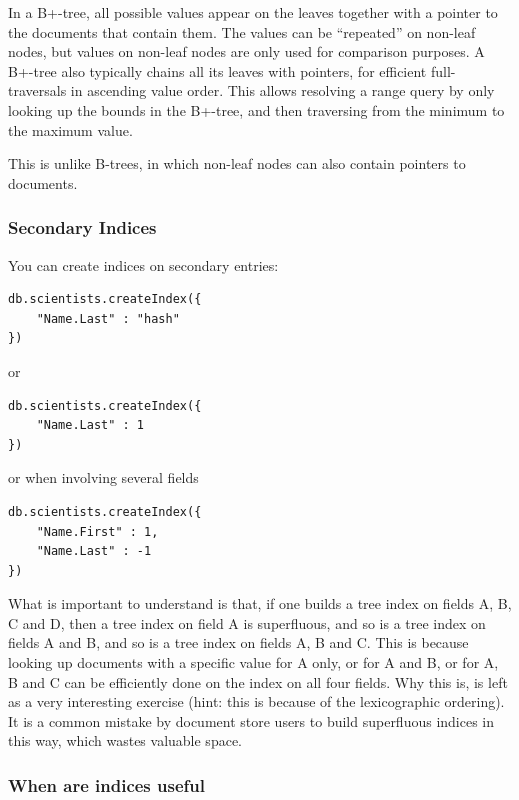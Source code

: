In a B+-tree, all possible values appear on the leaves together with a pointer to the documents that contain them. The values can be “repeated” on non-leaf nodes, but values on non-leaf nodes are only used for comparison purposes. A B+-tree also typically chains all its leaves with pointers, for efficient full-traversals in ascending value order. This allows resolving a range query by only looking up the bounds in the B+-tree, and then traversing from the minimum to the maximum value.

This is unlike B-trees, in which non-leaf nodes can also contain pointers to documents.

\subsubsection{Secondary Indices}

You can create indices on secondary entries:

\begin{lstlisting}[style=neutral]
db.scientists.createIndex({
    "Name.Last" : "hash"
})
\end{lstlisting}
or
\begin{lstlisting}[style=neutral]
db.scientists.createIndex({
    "Name.Last" : 1
})
\end{lstlisting}
or when involving several fields
\begin{lstlisting}[style=neutral]
db.scientists.createIndex({
    "Name.First" : 1,
    "Name.Last" : -1
})
\end{lstlisting}

What is important to understand is that, if one builds a tree index on fields A, B, C and D, then a tree index on field A is superfluous, and so is a tree index on fields A and B, and so is a tree index on fields A, B and C. This is because looking up documents with a specific value for A only, or for A and B, or for A, B and C can be efficiently done on the index on all four fields. Why this is, is left as a very interesting exercise (hint: this is because of the lexicographic ordering).
It is a common mistake by document store users to build superfluous indices in this way, which wastes valuable space.

\subsubsection{When are indices useful}

